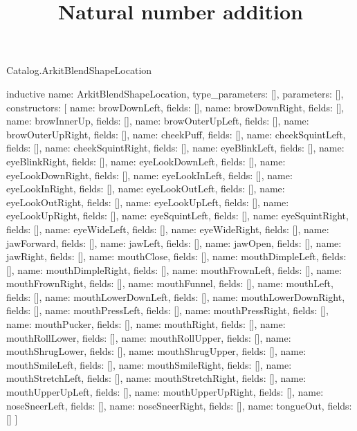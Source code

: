\begin{lexlean}{Catalog.ArkitBlendShapeLocation}
\title{Natural number addition}
\begin{semanticmodule}
inductive{
  name: ArkitBlendShapeLocation,
  type_parameters: [],
  parameters: [],
  constructors: [
    {name: browDownLeft, fields: []},
    {name: browDownRight, fields: []},
    {name: browInnerUp, fields: []},
    {name: browOuterUpLeft, fields: []},
    {name: browOuterUpRight, fields: []},
    {name: cheekPuff, fields: []},
    {name: cheekSquintLeft, fields: []},
    {name: cheekSquintRight, fields: []},
    {name: eyeBlinkLeft, fields: []},
    {name: eyeBlinkRight, fields: []},
    {name: eyeLookDownLeft, fields: []},
    {name: eyeLookDownRight, fields: []},
    {name: eyeLookInLeft, fields: []},
    {name: eyeLookInRight, fields: []},
    {name: eyeLookOutLeft, fields: []},
    {name: eyeLookOutRight, fields: []},
    {name: eyeLookUpLeft, fields: []},
    {name: eyeLookUpRight, fields: []},
    {name: eyeSquintLeft, fields: []},
    {name: eyeSquintRight, fields: []},
    {name: eyeWideLeft, fields: []},
    {name: eyeWideRight, fields: []},
    {name: jawForward, fields: []},
    {name: jawLeft, fields: []},
    {name: jawOpen, fields: []},
    {name: jawRight, fields: []},
    {name: mouthClose, fields: []},
    {name: mouthDimpleLeft, fields: []},
    {name: mouthDimpleRight, fields: []},
    {name: mouthFrownLeft, fields: []},
    {name: mouthFrownRight, fields: []},
    {name: mouthFunnel, fields: []},
    {name: mouthLeft, fields: []},
    {name: mouthLowerDownLeft, fields: []},
    {name: mouthLowerDownRight, fields: []},
    {name: mouthPressLeft, fields: []},
    {name: mouthPressRight, fields: []},
    {name: mouthPucker, fields: []},
    {name: mouthRight, fields: []},
    {name: mouthRollLower, fields: []},
    {name: mouthRollUpper, fields: []},
    {name: mouthShrugLower, fields: []},
    {name: mouthShrugUpper, fields: []},
    {name: mouthSmileLeft, fields: []},
    {name: mouthSmileRight, fields: []},
    {name: mouthStretchLeft, fields: []},
    {name: mouthStretchRight, fields: []},
    {name: mouthUpperUpLeft, fields: []},
    {name: mouthUpperUpRight, fields: []},
    {name: noseSneerLeft, fields: []},
    {name: noseSneerRight, fields: []},
    {name: tongueOut, fields: []}
  ]
}
\end{semanticmodule}
\end{lexlean}
